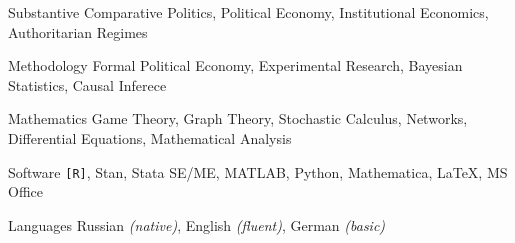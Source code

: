 

\begin{cvskills}

\cvskill
    {Substantive} %
    {Comparative Politics, Political Economy, Institutional Economics, Authoritarian Regimes}

\cvskill
    {Methodology} %
    {Formal Political Economy, Experimental Research, Bayesian Statistics, Causal Inferece}

\cvskill
    {Mathematics} %
    {Game Theory, Graph Theory, Stochastic Calculus, Networks, Differential Equations, Mathematical Analysis}

\cvskill
    {Software} %
    {\texttt{[R]}, Stan, Stata SE/ME, MATLAB, Python, Mathematica, \LaTeX, MS Office} %


  \cvskill
    {Languages} %
    {Russian \emph{(native)}, English \emph{(fluent)}, German \emph{(basic)}} %

\end{cvskills}
